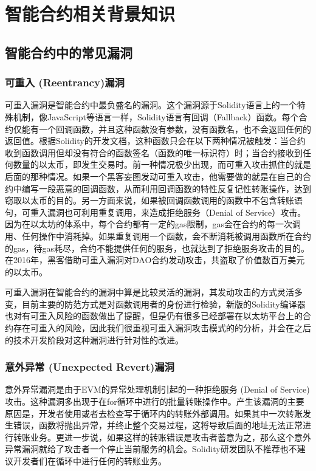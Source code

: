 
\chapter{智能合约相关背景知识}

\section{智能合约中的常见漏洞}

\subsection{可重入 (Reentrancy)漏洞}

可重入漏洞是智能合约中最负盛名的漏洞。这个漏洞源于Solidity语言上的一个特殊机制，像JavaScript等语言一样，Solidity语言有回调（Fallback）函数。每个合约仅能有一个回调函数，并且这种函数没有参数，没有函数名，也不会返回任何的返回值。根据Solidity的开发文档，这种函数只会在以下两种情况被触发：当合约收到函数调用但却没有符合的函数签名（函数的唯一标识符）时；当合约接收到任何数量的以太币，即发生交易时。前一种情况极少出现，而可重入攻击抓住的就是后面的那种情况。如果一个黑客妄图发动可重入攻击，他需要做的就是在自己的合约中编写一段恶意的回调函数，从而利用回调函数的特性反复记性转账操作，达到窃取以太币的目的。另一方面来说，如果被回调函数调用的函数中不包含转账语句，可重入漏洞也可利用重复调用，来造成拒绝服务（Denial of Service）攻击。因为在以太坊的体系中，每个合约都有一定的gas限制，gas会在合约的每一次调用、任何操作中消耗掉。如果重复调用一个函数，会不断消耗被调用函数所在合约的gas，待gas耗尽，合约不能提供任何的服务，也就达到了拒绝服务攻击的目的。在2016年，黑客借助可重入漏洞对DAO合约发动攻击，共盗取了价值数百万美元的以太币。

可重入漏洞在智能合约的漏洞中算是比较灵活的漏洞，其发动攻击的方式灵活多变，目前主要的防范方式是对函数调用者的身份进行检验，新版的Solidity编译器也对有可重入风险的函数做出了提醒，但是仍有很多已经部署在以太坊平台上的合约存在可重入的风险，因此我们很重视可重入漏洞攻击模式的的分析，并会在之后的技术开发阶段对这种漏洞进行针对性的改进。

\subsection{意外异常 (Unexpected Revert)漏洞}

意外异常漏洞是由于EVM的异常处理机制引起的一种拒绝服务 (Denial of Service) 攻击。这种漏洞多出现于在for循环中进行的批量转账操作中。产生该漏洞的主要原因是，开发者使用或者去检查写于循环内的转账外部调用。如果其中一次转账发生错误，函数将抛出异常，并终止整个交易过程，这将导致后面的地址无法正常进行转账业务。更进一步说，如果这样的转账错误是攻击者蓄意为之，那么这个意外异常漏洞就给了攻击者一个停止当前服务的机会。Solidity研发团队不推荐也不建议开发者们在循环中进行任何的转账业务。

